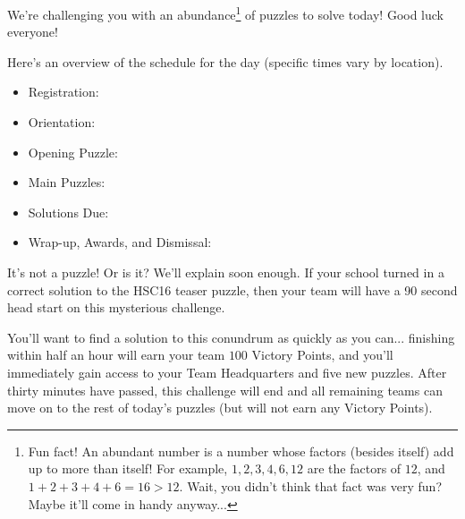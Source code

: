 
\begin{rules}
We're challenging you with an abundance\footnote{
  Fun fact! An abundant number is a number whose factors
  (besides itself) add up to more than itself! For example,
  \({1,2,3,4,6,12}\) are the factors of \(12\), and \(1+2+3+4+6=16>12\).
  Wait, you didn't think that fact was very fun? Maybe it'll come in
  handy anyway...
} of puzzles to solve today! Good luck
everyone!

\vfill


Here's an overview of the schedule for the day
(specific times vary by location).

\begin{itemize}
\item Registration: \underline{\hspace{10em}}
\item Orientation: \underline{\hspace{10em}}
\item Opening Puzzle: \underline{\hspace{10em}}
\item Main Puzzles: \underline{\hspace{10em}}
\item Solutions Due: \underline{\hspace{10em}}
\item Wrap-up, Awards, and Dismissal: \underline{\hspace{10em}}
\end{itemize}

\vfill


It's not a puzzle! Or is it? We'll explain soon enough.
If your school turned in a correct solution to the HSC16 teaser
puzzle, then your team will have a 90 second head start on this mysterious
challenge.

You'll want to find a solution to this conundrum as quickly as you can...
finishing within half an hour will earn your team
\(100\) Victory Points, and you'll immediately gain access to your Team Headquarters
and five new puzzles. After thirty minutes have passed, this challenge will end
and all remaining teams can move on to the rest of today's puzzles (but
will not earn any Victory Points).

\vfill



\end{rules}
